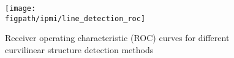 
\begin{figure}
\centering
\texttt{[image: \\figpath/ipmi/line\_detection\_roc]}
%
\caption{Receiver operating characteristic (ROC) curves for different curvilinear structure detection methods}
\label{f:detection_roc}
\end{figure}
